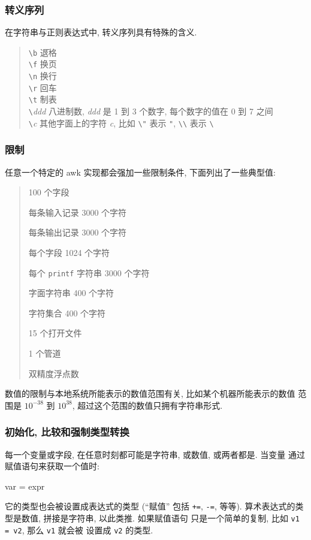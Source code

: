 \subsubsection{转义序列}
在字符串与正则表达式中, 转义序列具有特殊的含义.
\begin{quote}
    \begin{tabbing}
        \verb'\b' \hspace{4em} \= 退格 \\
        \verb'\f' \> 换页 \\
        \verb'\n' \> 换行 \\
        \verb'\r' \> 回车 \\
        \verb'\t' \> 制表 \\
        \verb'\'\textit{ddd} \> 八进制数, \textit{ddd} 是 1 到 3 个数字,
        每个数字的值在 0 到 7 之间 \\
        \verb'\'\textit{c} \> 其他字面上的字符 \textit{c}, 比如 \verb'\"'
        表示 \verb'"', \verb'\\' 表示 \verb'\' \\
    \end{tabbing}
\end{quote}

\subsubsection{限制}
任意一个特定的 awk 实现都会强加一些限制条件, 下面列出了一些典型值:
\begin{quote}
    100 个字段 \par
    每条输入记录 3000 个字符 \par
    每条输出记录 3000 个字符 \par
    每个字段 1024 个字符 \par
    每个 \texttt{printf} 字符串 3000 个字符 \par
    字面字符串 400 个字符 \par
    字符集合 400 个字符 \par
    15 个打开文件 \par
    1 个管道 \par
    双精度浮点数
\end{quote}
数值的限制与本地系统所能表示的数值范围有关, 比如某个机器所能表示的数值 
范围是 $10^{-38}$ 到  $10^{38}$, 超过这个范围的数值只拥有字符串形式.
\subsubsection{初始化, 比较和强制类型转换}
每一个变量或字段, 在任意时刻都可能是字符串, 或数值, 或两者都是. 当变量
通过赋值语句来获取一个值时:
\begin{awkcode}
    var = expr
\end{awkcode}
它的类型也会被设置成表达式的类型 (``赋值'' 包括 \texttt{+=}, \texttt{-=},
等等). 算术表达式的类型是数值, 拼接是字符串, 以此类推. 如果赋值语句 
只是一个简单的复制, 比如 \texttt{v1 = v2}, 那么 \texttt{v1} 就会被
设置成 \texttt{v2} 的类型.

